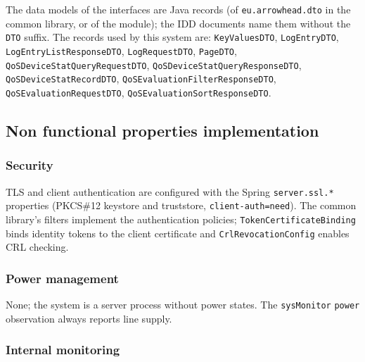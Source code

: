 \documentclass[a4paper]{arrowhead}
\begin{document}
The data models of the interfaces are Java records (of \texttt{eu.arrowhead.dto} in the common library, or of the module); the IDD documents name them without the \texttt{DTO} suffix. The records used by this system are: \texttt{KeyValuesDTO}, \texttt{LogEntryDTO}, \texttt{Log\allowbreak{}Entry\allowbreak{}List\allowbreak{}Response\allowbreak{}DTO}, \texttt{LogRequestDTO}, \texttt{PageDTO}, \texttt{Qo\allowbreak{}SDevice\allowbreak{}Stat\allowbreak{}Query\allowbreak{}Request\allowbreak{}DTO}, \texttt{Qo\allowbreak{}SDevice\allowbreak{}Stat\allowbreak{}Query\allowbreak{}Response\allowbreak{}DTO}, \texttt{Qo\allowbreak{}SDevice\allowbreak{}Stat\allowbreak{}Record\allowbreak{}DTO}, \texttt{Qo\allowbreak{}SEvaluation\allowbreak{}Filter\allowbreak{}Response\allowbreak{}DTO}, \texttt{Qo\allowbreak{}SEvaluation\allowbreak{}Request\allowbreak{}DTO}, \texttt{Qo\allowbreak{}SEvaluation\allowbreak{}Sort\allowbreak{}Response\allowbreak{}DTO}.

\subsection{Non functional properties implementation}

\subsubsection{Security}

TLS and client authentication are configured with the Spring \texttt{server.\allowbreak{}ssl.\allowbreak{}*} properties (PKCS\#12 keystore and truststore, \texttt{client-\allowbreak{}auth=\allowbreak{}need}). The common library's filters implement the authentication policies; \texttt{Token\allowbreak{}Certificate\allowbreak{}Binding} binds identity tokens to the client certificate and \texttt{Crl\allowbreak{}Revocation\allowbreak{}Config} enables CRL checking.

\subsubsection{Power management}

None; the system is a server process without power states. The \texttt{sysMonitor} \texttt{power} observation always reports line supply.

\subsubsection{Internal monitoring}
\end{document}
